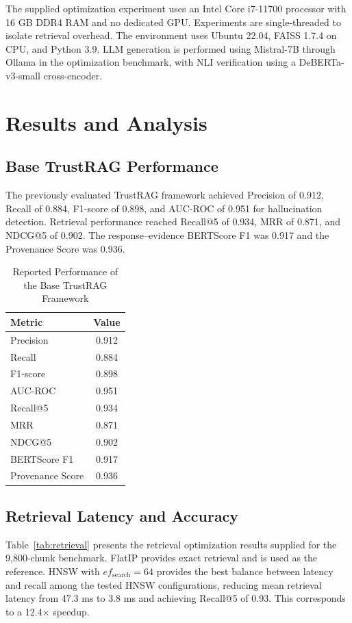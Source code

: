 \documentclass[conference]{IEEEtran}
\begin{document}
The supplied optimization experiment uses an Intel Core i7-11700 processor with 16 GB DDR4 RAM and no dedicated GPU. Experiments are single-threaded to isolate retrieval overhead. The environment uses Ubuntu 22.04, FAISS 1.7.4 on CPU, and Python 3.9. LLM generation is performed using Mistral-7B through Ollama in the optimization benchmark, with NLI verification using a DeBERTa-v3-small cross-encoder.

\section{Results and Analysis}

\subsection{Base TrustRAG Performance}

The previously evaluated TrustRAG framework achieved Precision of 0.912, Recall of 0.884, F1-score of 0.898, and AUC-ROC of 0.951 for hallucination detection. Retrieval performance reached Recall@5 of 0.934, MRR of 0.871, and NDCG@5 of 0.902. The response--evidence BERTScore F1 was 0.917 and the Provenance Score was 0.936.

\begin{table}[t]
\caption{Reported Performance of the Base TrustRAG Framework}
\label{tab:base}
\centering
\small
\begin{tabular}{@{}lc@{}}
\toprule
Metric & Value\\
\midrule
Precision & 0.912\\
Recall & 0.884\\
F1-score & 0.898\\
AUC-ROC & 0.951\\
Recall@5 & 0.934\\
MRR & 0.871\\
NDCG@5 & 0.902\\
BERTScore F1 & 0.917\\
Provenance Score & 0.936\\
\bottomrule
\end{tabular}
\end{table}

\subsection{Retrieval Latency and Accuracy}

Table~\ref{tab:retrieval} presents the retrieval optimization results supplied for the 9,800-chunk benchmark. FlatIP provides exact retrieval and is used as the reference. HNSW with $ef_{\mathrm{search}}=64$ provides the best balance between latency and recall among the tested HNSW configurations, reducing mean retrieval latency from 47.3 ms to 3.8 ms and achieving Recall@5 of 0.93. This corresponds to a 12.4$\times$ speedup.
\end{document}
